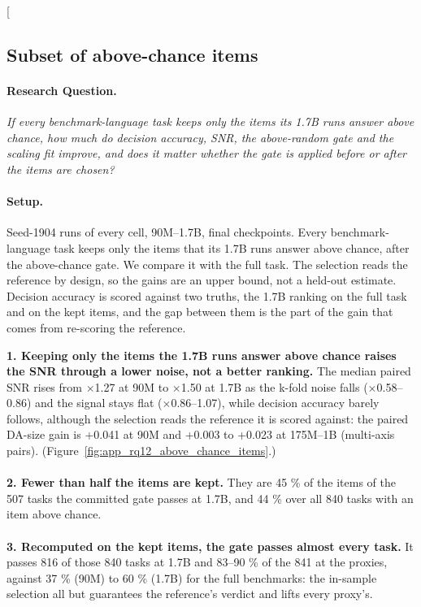 \clearpage
\twocolumn[{%
\subsection{Subset of above-chance items}
\label{app:rq12_above_chance_items}

\noindent\begin{minipage}[t]{0.485\textwidth}
\vspace{0pt}
\paragraph{Research Question.} \emph{If every benchmark-language task keeps only the items its 1.7B runs answer above chance, how much do decision accuracy, SNR, the above-random gate and the scaling fit improve, and does it matter whether the gate is applied before or after the items are chosen?}

\paragraph{Setup.} Seed-1904 runs of every cell, 90M--1.7B, final checkpoints. Every benchmark-language task keeps only the items that its 1.7B runs answer above chance, after the above-chance gate. We compare it with the full task. The selection reads the reference by design, so the gains are an upper bound, not a held-out estimate. Decision accuracy is scored against two truths, the 1.7B ranking on the full task and on the kept items, and the gap between them is the part of the gain that comes from re-scoring the reference.
\end{minipage}\hfill
\begin{minipage}[t]{0.485\textwidth}
\vspace{0pt}
\begin{rqfinding}
\textbf{1. Keeping only the items the 1.7B runs answer above chance raises the SNR through a lower noise, not a better ranking.} The median paired SNR rises from $\times$1.27 at 90M to $\times$1.50 at 1.7B as the k-fold noise falls ($\times$0.58--0.86) and the signal stays flat ($\times$0.86--1.07), while decision accuracy barely follows, although the selection reads the reference it is scored against: the paired DA-size gain is +0.041 at 90M and +0.003 to +0.023 at 175M--1B (multi-axis pairs). (Figure~\ref{fig:app_rq12_above_chance_items}.)
\\
\\
\textbf{2. Fewer than half the items are kept.} They are 45 \% of the items of the 507 tasks the committed gate passes at 1.7B, and 44 \% over all 840 tasks with an item above chance.
\\
\\
\textbf{3. Recomputed on the kept items, the gate passes almost every task.} It passes 816 of those 840 tasks at 1.7B and 83--90 \% of the 841 at the proxies, against 37 \% (90M) to 60 \% (1.7B) for the full benchmarks: the in-sample selection all but guarantees the reference's verdict and lifts every proxy's.
\end{rqfinding}
\end{minipage}

}

